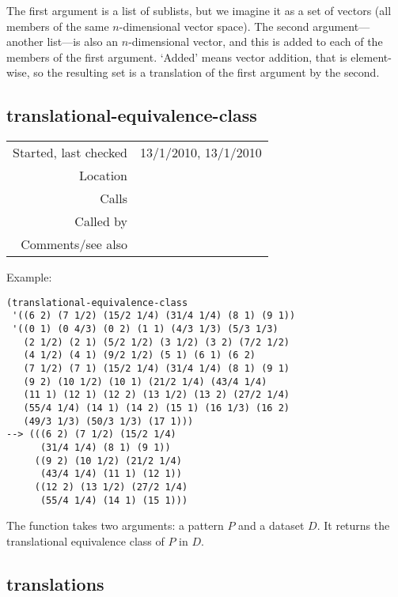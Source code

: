 \noindent The first argument is a list of sublists,
but we imagine it as a set of vectors (all members of
the same $n$-dimensional vector space). The second
argument---another list---is also an $n$-dimensional
vector, and this is added to each of the members of
the first argument. `Added' means vector addition,
that is element-wise, so the resulting set is a
translation of the first argument by the second.


\subsection*{translational-equivalence-class}\label{fun:translational-equivalence-class}

\vspace{0.3cm}
\begin{tabular}{r|p{8cm}}
Started, last checked & 13/1/2010, 13/1/2010 \\
Location & \nameref{sec:set-operations} \\
Calls & \nameref{fun:translation} \\
Called by & \\
Comments/see also &
\end{tabular}

\vspace{0.5cm}
\noindent Example:
\begin{verbatim}
(translational-equivalence-class
 '((6 2) (7 1/2) (15/2 1/4) (31/4 1/4) (8 1) (9 1))
 '((0 1) (0 4/3) (0 2) (1 1) (4/3 1/3) (5/3 1/3)
   (2 1/2) (2 1) (5/2 1/2) (3 1/2) (3 2) (7/2 1/2)
   (4 1/2) (4 1) (9/2 1/2) (5 1) (6 1) (6 2)
   (7 1/2) (7 1) (15/2 1/4) (31/4 1/4) (8 1) (9 1)
   (9 2) (10 1/2) (10 1) (21/2 1/4) (43/4 1/4)
   (11 1) (12 1) (12 2) (13 1/2) (13 2) (27/2 1/4)
   (55/4 1/4) (14 1) (14 2) (15 1) (16 1/3) (16 2)
   (49/3 1/3) (50/3 1/3) (17 1)))
--> (((6 2) (7 1/2) (15/2 1/4)
      (31/4 1/4) (8 1) (9 1))
     ((9 2) (10 1/2) (21/2 1/4)
      (43/4 1/4) (11 1) (12 1))
     ((12 2) (13 1/2) (27/2 1/4)
      (55/4 1/4) (14 1) (15 1)))
\end{verbatim}

\noindent The function takes two arguments: a pattern
$P$ and a dataset $D$. It returns the translational
equivalence class of $P$ in $D$.


\subsection*{translations}\label{fun:translations}

